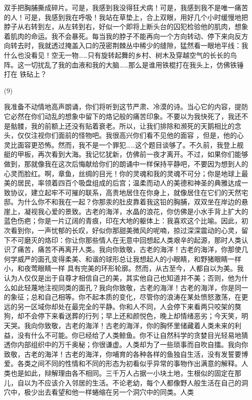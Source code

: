 \documentclass{article}
\begin{document}
\newpage
双手把胸脯撕成碎片。可是，我感到我没得狂犬病！可是，我感到我不是唯一痛苦的人！可是，我感到我在呼吸！我站在草垫上，合上双眼，用好几个小时缓慢地把脖子从右转到左，从左转到右，好似一个即将上断头台的囚犯检验他的肌肉，想象着肌肉的命运。我不会暴死。每当我的脖子不能再向一个方向转动、停下来向反方向转去时，我就透过掩盖入口的茂密荆棘丛中稀少的缝隙，猛然看一眼地平线：我什么也没看见！空无一物……只有旋转起舞的乡村、树木及穿越空气的长长的鸟阵。这一切扰乱了我的血液和我的大脑……那么是谁用铁棍打在我头上，仿佛铁锤打在
铁砧上？ 


(9) 

我准备不动情地高声朗诵，你们将听到这节严肃、冷漠的诗。当心它的内容，提防它必然在你们动乱的想象中留下的烙记般的痛苦印象。不要以为我快死了，我还不是骷髅，我的前额上还没有贴着衰老。所以，让我们排除和濒死的天鹅相比的念头，仅仅注视你们面前的怪物吧。我很高兴你们看不见他的面容
\newpage
，但是，他的心灵比面容更恐怖。然而，我不是一个罪犯……这个题目谈够了。不久前，我登上舰艇的甲板，再次看到大海。我记忆犹新，仿佛前一夜才离开。不过，如果你们能够做到，那就像我在这次后悔献给你们的朗诵中一样保持平静吧，不要因为想到人的心灵而脸红。啊，章鱼，丝绸的目光！你的灵魂和我的灵魂不可分；你是地球上最美的居民，率领着四百个吸盘组成的后宫；温柔而动人的美德和神圣的典雅达成一致协议，建立起牢不可摧的联系，高贵地居住在你身上，就像居住在它们的天然宅邸。为什么你不和我在一起？你那汞的肚皮靠着我这铅的胸脯，双双坐在岸边的悬崖上，凝视我心爱的景致。古老的海洋，水晶的浪花，你仿佛是小水手背上扩大的蓝色伤疤；你是一片辽阔的青痕，印在大地的躯体上：我喜欢这个比喻。因此，初次看到你，一声忧郁的长叹，好似你那甜美微风的呢喃，掠过深深震动的心灵，留下不可磨灭的烙印：你让你那些情人在无意中回想起人类艰辛的起源，那时人类认识了痛苦，痛苦不再离开人类。我向你致敬，古老的海洋！古老的海洋，你那使几何学威严的面孔变得柔美、和谐的球形总让我想起人的小眼睛，和野猪眼睛一样小，和夜莺眼睛一样
\newpage
具有完美的环形轮廓。然而，从古至今，人都自以为美。我认为人仅仅是出于自尊才相信自己的美，其实他自己也知道并不美；否则，他为什么如此轻蔑地注视同类的面孔？我向你致敬，古老的海洋！古老的海洋，你是同一的象征；总和自己相等。你不起本质的变化，尽管你的浪涛在某处愤怒激荡，在更远的另一区域你却处在最完全的平静。你和人不同，人会停下来看两只咬架的獒狗，却不会停下来看送葬的行列；早上还和颜悦色，晚上却情绪恶劣；今天笑，明天哭。我向你致敬，古老的海洋！古老的海洋，你的胸怀里储藏着人类未来的利益，没有什么不可能。你已经给了人类鲸鱼。你不让自然科学的贪婪目光轻易地猜透你内部组织中的万千奥秘；你很谦虚。人类却为了一些琐事而自吹自擂。我向你致敬，古老的海洋！古老的海洋，你哺育的各种各样的鱼独自生活，没有发誓要博爱。各类之间不同的性情和不同的形态为初看似乎异常的事物作出满意的解释。人类也是如此，辩解理由各不相同。三千万人占据一小块土地，生根似的固定在那儿，自以为不应该介入邻居的生活。不论老幼，每个人都像野人般生活在自己的洞穴中，极少出去看望和他一样蜷缩在另一个洞穴中的同类。人类
\end{document}
